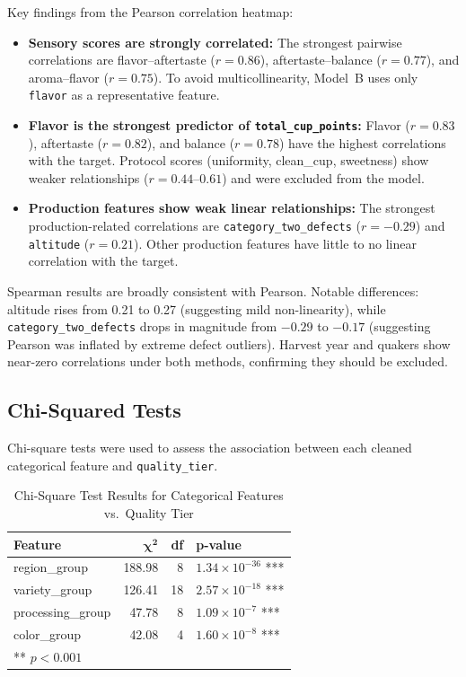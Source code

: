 \documentclass[12pt, a4paper]{article}
\begin{document}
Key findings from the Pearson correlation heatmap:
\begin{itemize}
  \item \textbf{Sensory scores are strongly correlated:} The strongest pairwise correlations are
        flavor--aftertaste ($r = 0.86$), aftertaste--balance ($r = 0.77$), and aroma--flavor
        ($r = 0.75$). To avoid multicollinearity, Model~B uses only \texttt{flavor} as a
        representative feature.
  \item \textbf{Flavor is the strongest predictor of \texttt{total\_cup\_points}:} Flavor
        ($r = 0.83$), aftertaste ($r = 0.82$), and balance ($r = 0.78$) have the highest
        correlations with the target. Protocol scores (uniformity, clean\_cup, sweetness) show
        weaker relationships ($r = 0.44$--$0.61$) and were excluded from the model.
  \item \textbf{Production features show weak linear relationships:} The strongest
        production-related correlations are \texttt{category\_two\_defects} ($r = -0.29$) and
        \texttt{altitude} ($r = 0.21$). Other production features have little to no linear
        correlation with the target.
\end{itemize}

Spearman results are broadly consistent with Pearson. Notable differences: altitude rises from 0.21
to 0.27 (suggesting mild non-linearity), while \texttt{category\_two\_defects} drops in magnitude
from $-0.29$ to $-0.17$ (suggesting Pearson was inflated by extreme defect outliers). Harvest year
and quakers show near-zero correlations under both methods, confirming they should be excluded.

\subsection{Chi-Squared Tests}

Chi-square tests were used to assess the association between each cleaned categorical feature and
\texttt{quality\_tier}.

\begin{table}[H]
  \centering
  \caption{Chi-Square Test Results for Categorical Features vs.\ Quality Tier}
  \begin{tabular}{lrrl}
    \toprule
    \textbf{Feature} & $\boldsymbol{\chi^2}$ & \textbf{df} & \textbf{p-value} \\
    \midrule
    region\_group     & 188.98 & 8 & $1.34 \times 10^{-36}$ *** \\
    variety\_group    & 126.41 & 18 & $2.57 \times 10^{-18}$ *** \\
    processing\_group &  47.78 &  8 & $1.09 \times 10^{-7}$  *** \\
    color\_group      &  42.08 &  4 & $1.60 \times 10^{-8}$  *** \\
    \bottomrule
    \multicolumn{4}{l}{\footnotesize *** $p < 0.001$}
  \end{tabular}
\end{table}
\end{document}
